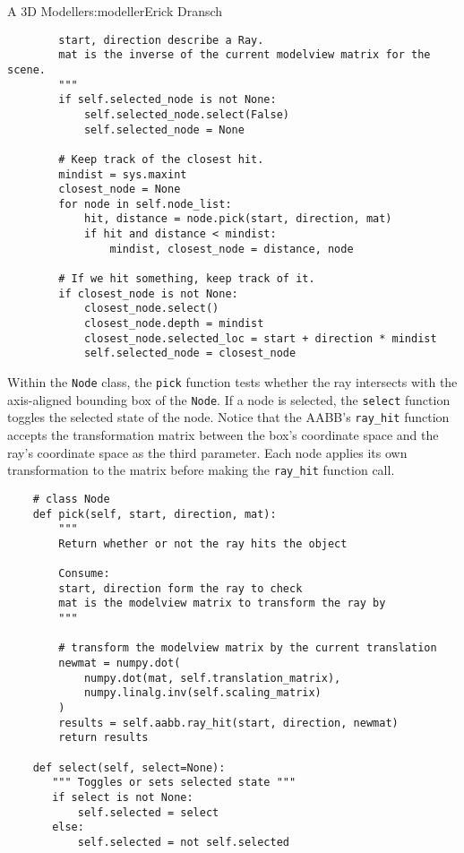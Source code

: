\begin{aosachapter}{A 3D Modeller}{s:modeller}{Erick Dransch}
\begin{verbatim}
        start, direction describe a Ray. 
        mat is the inverse of the current modelview matrix for the scene.
        """
        if self.selected_node is not None:
            self.selected_node.select(False)
            self.selected_node = None
    
        # Keep track of the closest hit.
        mindist = sys.maxint
        closest_node = None
        for node in self.node_list:
            hit, distance = node.pick(start, direction, mat)
            if hit and distance < mindist:
                mindist, closest_node = distance, node
    
        # If we hit something, keep track of it.
        if closest_node is not None:
            closest_node.select()
            closest_node.depth = mindist
            closest_node.selected_loc = start + direction * mindist
            self.selected_node = closest_node
\end{verbatim}

Within the \texttt{Node} class, the \texttt{pick} function tests whether
the ray intersects with the axis-aligned bounding box of the
\texttt{Node}. If a node is selected, the \texttt{select} function
toggles the selected state of the node. Notice that the AABB's
\texttt{ray\_hit} function accepts the transformation matrix between the
box's coordinate space and the ray's coordinate space as the third
parameter. Each node applies its own transformation to the matrix before
making the \texttt{ray\_hit} function call.

\begin{verbatim}
    # class Node
    def pick(self, start, direction, mat):
        """ 
        Return whether or not the ray hits the object

        Consume:  
        start, direction form the ray to check
        mat is the modelview matrix to transform the ray by 
        """

        # transform the modelview matrix by the current translation
        newmat = numpy.dot(
            numpy.dot(mat, self.translation_matrix), 
            numpy.linalg.inv(self.scaling_matrix)
        )
        results = self.aabb.ray_hit(start, direction, newmat)
        return results

    def select(self, select=None):
       """ Toggles or sets selected state """
       if select is not None:
           self.selected = select
       else:
           self.selected = not self.selected
    
\end{verbatim}


\end{aosachapter}
